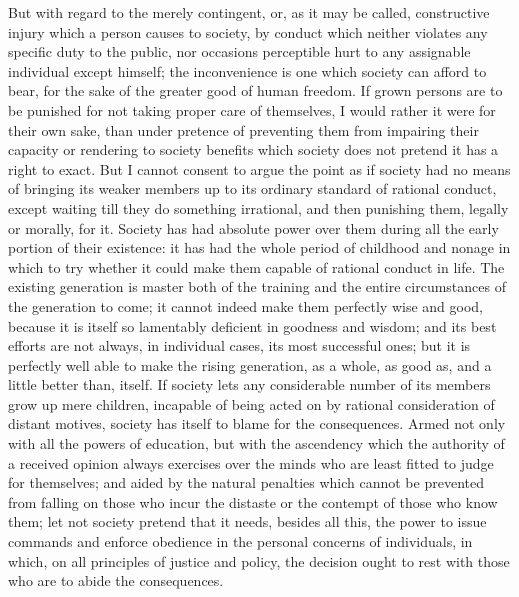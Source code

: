 \documentclass[11pt,openany]{book}
\begin{document}
But with regard to the merely contingent, or, as it may be called, constructive injury which a person causes to society, by conduct which neither violates any specific duty to the public, nor occasions perceptible hurt to any assignable individual except himself; the inconvenience is one which society can afford to bear, for the sake of the greater good of human freedom. If grown persons are to be punished for not taking proper care of themselves, I would rather it were for their own sake, than under pretence of preventing them from impairing their capacity or rendering to society benefits which society does not pretend it has a right to exact. But I cannot consent to argue the point as if society had no means of bringing its weaker members up to its ordinary standard of rational conduct, except waiting till they do something irrational, and then punishing them, legally or morally, for it. Society has had absolute power over them during all the early portion of their existence: it has had the whole period of childhood and nonage in which to try whether it could make them capable of rational conduct in life. The existing generation is master both of the training and the entire circumstances of the generation to come; it cannot indeed make them perfectly wise and good, because it is itself so lamentably deficient in goodness and wisdom; and its best efforts are not always, in individual cases, its most successful ones; but it is perfectly well able to make the rising generation, as a whole, as good as, and a little better than, itself. If society lets any considerable number of its members grow up mere children, incapable of being acted on by rational consideration of distant motives, society has itself to blame for the consequences. Armed not only with all the powers of education, but with the ascendency which the authority of a received opinion always exercises over the minds who are least fitted to judge for themselves; and aided by the natural penalties which cannot be prevented from falling on those who incur the distaste or the contempt of those who know them; let not society pretend that it needs, besides all this, the power to issue commands and enforce obedience in the personal concerns of individuals, in which, on all principles of justice and policy, the decision ought to rest with those who are to abide the consequences.
\end{document}
